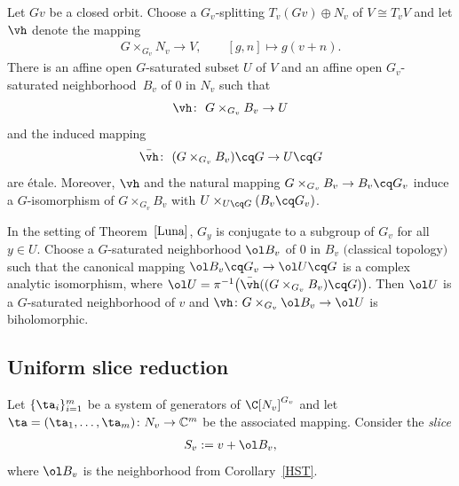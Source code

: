 \begin{Theorem} \label{Luna}
Let $Gv$ be a closed orbit.
Choose a $G_v$-splitting \mbox{$T_v (Gv) \oplus N_v$} of $V \cong T_v V$ and let $\vh$ denote the mapping
\begin{gather*}
 G \times_{G_v} N_v \to V, \qquad [g,n] \mapsto g(v+n).
\end{gather*}
There is an affine open $G$-saturated subset $U$ of $V$ and an affine open $G_v$-saturated neighborhood~$B_v$ of $0$ in $N_v$
such that
\begin{gather*}
 \vh \colon\ G \times_{G_v} B_v \to U
\end{gather*}
and the induced mapping
\begin{gather*}
 \bar \vh \colon\ (G \times_{G_v} B_v)\cq G \to U\cq G
\end{gather*}
are \'etale.
Moreover, $\vh$ and the natural mapping $G \times_{G_v} B_v \to B_v \cq G_v$
induce a $G$-isomorphism of $G \times_{G_v} B_v$ with $U \times_{U\cq G} (B_v\cq G_v)$.
\end{Theorem}

\begin{Corollary} \label{HST}
 In the setting of Theorem~$\ref{Luna}$,
 $G_y$ is conjugate to a subgroup of $G_v$ for all $y \in U$.	
 Choose a $G$-saturated neighborhood $\ol B_v$ of $0$ in $B_v$ $($classical topology$)$
 such that the canonical mapping $\ol B_v \cq G_v \to \ol U \cq G$ is a complex analytic isomorphism,
 where $\ol U = \pi^{-1}\big(\bar \vh((G \times_{G_v} B_v)\cq G)\big)$.
 Then $\ol U$ is a $G$-saturated neighborhood of $v$ and $\vh \colon G \times_{G_v} \ol B_v \to \ol U$
 is biholomorphic.
\end{Corollary}

\subsection{Uniform slice reduction} \label{ssec:red}

Let $\{\ta_i\}_{i=1}^m$ be a system of generators of $\C[N_v]^{G_v}$ and
let $\ta = (\ta_1,\dots,\ta_m) \colon N_v \rightarrow \mathbb{C}^m$ be the associated mapping.
Consider the \emph{slice}
\begin{gather*}%
 S_v := v+\ol B_v,
\end{gather*}
where $\ol B_v$ is the neighborhood from Corollary~\ref{HST}.



